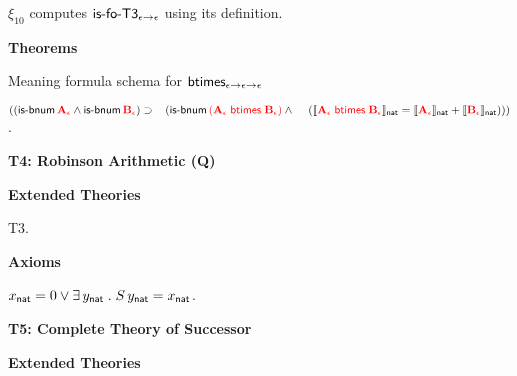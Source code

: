 \documentclass[fleqn,11pt]{article}
\begin{document}
    \item $\xi_{10}$ computes $\mbox{\sf is-fo-T3}_{\epsilon \rightarrow
      \epsilon}$ using its definition.

  \ee

  \item[] \textbf{Theorems}

  \be

    \setcounter{enumi}{1}

    \item Meaning formula schema for
    $\mbox{\sf btimes}_{\epsilon \rightarrow \epsilon \rightarrow \epsilon}$

    $((\mbox{\sf is-bnum} \, \textcolor{red}{\textbf{A}_\epsilon} \wedge 
      \mbox{\sf is-bnum} \, \textcolor{red}{\textbf{B}_\epsilon}) 
      \supset {}\\
      \hspace*{2ex}(\mbox{\sf is-bnum} \, 
      \textcolor{red}{(\textbf{A}_\epsilon \; \mbox{\sf btimes} \; \textbf{B}_\epsilon)} \wedge {}\\
      \hspace*{2.8ex}(\llbracket\textcolor{red}{\textbf{A}_\epsilon \; \mbox{\sf btimes} \; 
      \textbf{B}_\epsilon}\rrbracket_{\sf nat} = 
      \llbracket\textcolor{red}{\textbf{A}_\epsilon}\rrbracket_{\sf nat} + 
      \llbracket\textcolor{red}{\textbf{B}_\epsilon}\rrbracket_{\sf nat})))$.

  \ee

\ei

\noindent
\textbf{T4: Robinson Arithmetic (Q)}

\bi

  \item[] \textbf{Extended Theories} 

  \be

    \setcounter{enumi}{2}

    \item T3.

  \ee

  \item[] \textbf{Axioms}

  \be

    \setcounter{enumi}{27}

    \item $x_{\sf nat} = 0 \vee \exists\, y_{\sf nat} \mathrel. S \,
      y_{\sf nat} = x_{\sf nat}$.

  \ee

\ei

\noindent
\textbf{T5: Complete Theory of Successor}

\bi

  \item[] \textbf{Extended Theories} 
\end{document}
